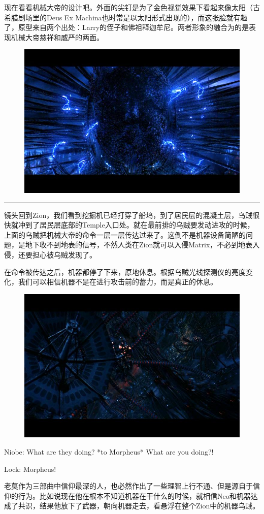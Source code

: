 \documentclass[UTF8]{ctexart}
\newcommand{\myparsep}{\noindent \rule[0.5ex]{\linewidth}{1pt}}
\newenvironment{myquote}{\color{green} \setlength{\leftskip}{6em} \setlength{\rightskip}{4em} \setlength{\parindent}{-2em}}{\par}
\begin{document}
现在看看机械大帝的设计吧。外面的尖钉是为了金色视觉效果下看起来像太阳（古希腊剧场里的Deus Ex Machina也时常是以太阳形式出现的），而这张脸就有趣了，原型来自两个出处：Larry的侄子和佛祖释迦牟尼。两者形象的融合为的是表现机械大帝慈祥和威严的两面。

\begin{figure}[htb]
\centering
\includegraphics[width=0.5\linewidth]{fig/99b590235f7eb645ac34de63.jpg}
\end{figure}

\myparsep

镜头回到Zion，我们看到挖掘机已经打穿了船坞，到了居民层的混凝土层，乌贼很快就冲到了居民层底部的Temple入口处。就在最前排的乌贼要发动进攻的时候，上面的乌贼把机械大帝的命令一层一层传达过来了。这倒不是机器设备简陋的问题，是地下收不到地表的信号，不然人类在Zion就可以入侵Matrix，不必到地表入侵，还要担心被乌贼发现了。

在命令被传达之后，机器都停了下来，原地休息。根据乌贼光线探测仪的亮度变化，我们可以相信机器不是在进行攻击前的蓄力，而是真正的休息。

\begin{figure}[htb]
\centering
\includegraphics[width=0.5\linewidth]{fig/c46dd8f948794458252df2d3.jpg}
\end{figure}

\begin{myquote}
Niobe: What are they doing? *to Morpheus* What are you doing?!

Lock: Morpheus!
\end{myquote}

老莫作为三部曲中信仰最深的人，也必然作出了一些理智上行不通、但是源自于信仰的行为。比如说现在他在根本不知道机器在干什么的时候，就相信Neo和机器达成了共识，结果他放下了武器，朝向机器走去，看悬浮在整个Zion中的机器乌贼。
\end{document}
